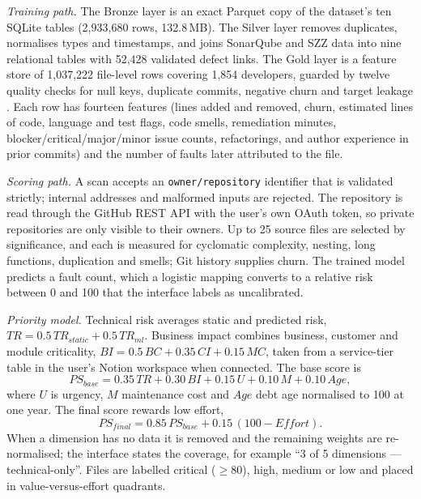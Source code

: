 \documentclass[conference]{IEEEtran}
\begin{document}
\textit{Training path.} The Bronze layer is an exact Parquet copy of the dataset's ten SQLite tables (2,933,680 rows, 132.8\,MB). The Silver layer removes duplicates, normalises types and timestamps, and joins SonarQube and SZZ data into nine relational tables with 52,428 validated defect links. The Gold layer is a feature store of 1,037,222 file-level rows covering 1,854 developers, guarded by twelve quality checks for null keys, duplicate commits, negative churn and target leakage \cite{lakehouse}. Each row has fourteen features (lines added and removed, churn, estimated lines of code, language and test flags, code smells, remediation minutes, blocker/critical/major/minor issue counts, refactorings, and author experience in prior commits) and the number of faults later attributed to the file.

\textit{Scoring path.} A scan accepts an \texttt{owner/repository} identifier that is validated strictly; internal addresses and malformed inputs are rejected. The repository is read through the GitHub REST API with the user's own OAuth token, so private repositories are only visible to their owners. Up to 25 source files are selected by significance, and each is measured for cyclomatic complexity, nesting, long functions, duplication and smells; Git history supplies churn. The trained model predicts a fault count, which a logistic mapping converts to a relative risk between 0 and 100 that the interface labels as uncalibrated.

\textit{Priority model.} Technical risk averages static and predicted risk, $TR = 0.5\,TR_{static} + 0.5\,TR_{ml}$. Business impact combines business, customer and module criticality, $BI = 0.5\,BC + 0.35\,CI + 0.15\,MC$, taken from a service-tier table in the user's Notion workspace when connected. The base score is
\begin{equation}
PS_{base} = 0.35\,TR + 0.30\,BI + 0.15\,U + 0.10\,M + 0.10\,Age,
\label{eq:base}
\end{equation}
where $U$ is urgency, $M$ maintenance cost and $Age$ debt age normalised to 100 at one year. The final score rewards low effort,
\begin{equation}
PS_{final} = 0.85\,PS_{base} + 0.15\,(100 - Effort).
\label{eq:final}
\end{equation}
When a dimension has no data it is removed and the remaining weights are re-normalised; the interface states the coverage, for example ``3 of 5 dimensions --- technical-only''. Files are labelled critical ($\geq 80$), high, medium or low and placed in value-versus-effort quadrants.
\end{document}
